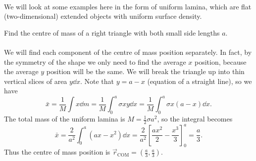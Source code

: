 \documentclass[../classical_mechanics.tex]{subfiles}
\begin{document}
        \paragraph{}
        We will look at some examples here in the form of uniform lamina, which are flat (two-dimensional) extended objects with uniform surface density.
        \begin{example}
            Find the centre of mass of a right triangle with both small side lengths $a$.
            \begin{figure}[H]
                \centering
            \end{figure}
            
            \paragraph{}
            We will find each component of the centre of mass position separately.
            In fact, by the symmetry of the shape we only need to find the average $x$ position, because the average $y$ position will be the same.
            We will break the triangle up into thin vertical slices of area $y\dd{x}$.
            Note that $y=a-x$ (equation of a straight line), so we have
            \begin{equation}
                \bar{x}=\frac{1}{M}\int x\dd{m}=\frac{1}{M}\int_0^a\sigma xy\dd{x}=\frac{1}{M}\int_0^a\sigma x(a-x)\dd{x}.
            \end{equation}
            The total mass of the uniform lamina is $M=\frac{1}{2}\sigma a^2$, so the integral becomes
            \begin{equation}
                \bar{x}=\frac{2}{a^2}\int_0^a(ax-x^2)\dd{x}=\frac{2}{a^2}\left[\frac{ax^2}{2}-\frac{x^3}{3}\right]_0^a=\frac{a}{3}.
            \end{equation}
            Thus the centre of mass position is $\vec{r}_\text{COM}=\left(\frac{a}{3},\frac{a}{3}\right)$.
        \end{example}
\end{document}

